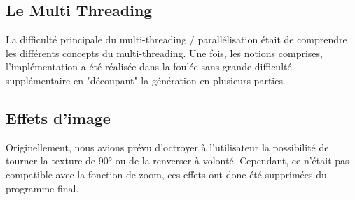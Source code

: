 \documentclass{article}
\begin{document}
\subsection*{Le Multi Threading}
La difficulté principale du multi-threading / parallélisation était de comprendre les différents concepts du multi-threading.
Une fois, les notions comprises, l'implémentation a été réalisée dans la foulée sans grande difficulté supplémentaire en "découpant" la génération en plusieurs parties.

\subsection*{Effets d'image}

Originellement, nous avions prévu d'octroyer à l'utilisateur la possibilité de tourner la texture de 90° ou de la renverser à volonté. Cependant, ce n'était pas compatible avec la fonction de zoom, ces effets ont donc été supprimées du programme final.
\end{document}
